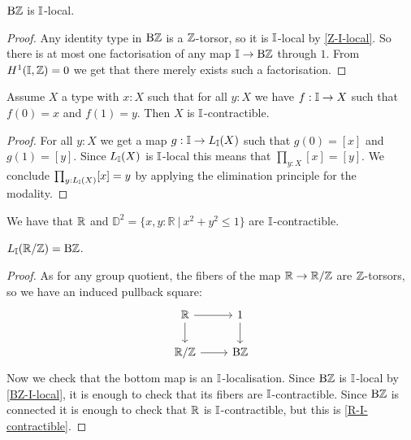 \begin{lemma}\label{BZ-I-local}
$\mathrm{B}\mathbb{Z}$ is $\mathbb{I}$-local.
\end{lemma}

\begin{proof}
Any identity type in $\mathrm{B}\mathbb{Z}$ is a $\mathbb{Z}$-torsor, so it is $\mathbb{I}$-local by \cref{Z-I-local}. So there is at most one factorisation of any map $\mathbb{I}\to \mathrm{B}\mathbb{Z}$ through $1$. From $H^1(\mathbb{I},\mathbb{Z})=0$ we get that there merely exists such a factorisation.
\end{proof}

\begin{lemma}\label{continuously-path-connected-contractible}
Assume $X$ a type with $x:X$ such that for all $y:X$ we have $f:\mathbb{I}\to X$ such that $f(0)=x$ and $f(1)=y$. Then $X$ is $\mathbb{I}$-contractible.
\end{lemma}

\begin{proof}
For all $y:X$ we get a map $g:\mathbb{I}\to L_{\mathbb{I}}(X)$ such that $g(0) = [x]$ and $g(1)=[y]$. Since $L_{\mathbb{I}}(X)$ is $\mathbb{I}$-local this means that $\prod_{y:X}[x]=[y]$. We conclude $\prod_{y:L_{\mathbb{I}}(X)}[x]=y$ by applying the elimination principle for the modality.
\end{proof}

\begin{corollary}\label{R-I-contractible}
We have that $\mathbb{R}$ and $\mathbb{D}^2=\{x,y:\mathbb R\ \vert\ x^2+y^2\leq 1\}$ are $\mathbb{I}$-contractible.
\end{corollary}

\begin{proposition}\label{shape-S1-is-BZ}
$L_{\mathbb{I}}(\mathbb{R}/\mathbb{Z}) = \mathrm{B}\mathbb{Z}$.
\end{proposition}

\begin{proof}
As for any group quotient, the fibers of the map $\mathbb{R}\to\mathbb{R}/\mathbb{Z}$ are $\mathbb{Z}$-torsors, so we have an induced pullback square:
\[
\begin{tikzcd}
\R\ar[r]\ar[d] & 1\ar[d] \\
\R/\Z\ar[r] & \B\Z
\end{tikzcd}
\]
Now we check that the bottom map is an $\mathbb{I}$-localisation. Since $\mathrm{B}\mathbb{Z}$ is $\mathbb{I}$-local by \cref{BZ-I-local}, it is enough to check that its fibers are $\mathbb{I}$-contractible. Since $\mathrm{B}\mathbb{Z}$ is connected it is enough to check that $\mathbb{R}$ is $\mathbb{I}$-contractible, but this is \cref{R-I-contractible}.
\end{proof}

